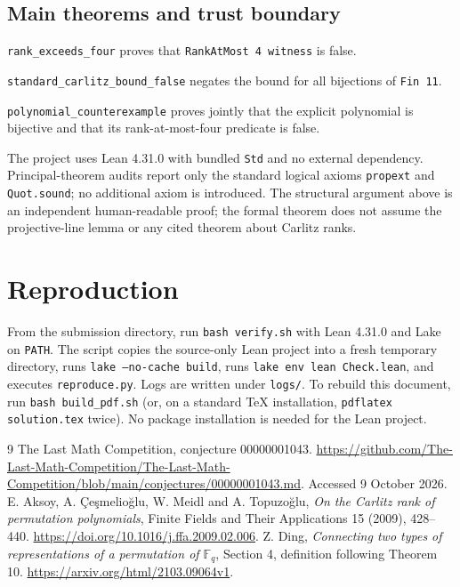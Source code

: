 \documentclass[11pt]{article}
\newcommand{\F}{\mathbb F}
\begin{document}
\subsection{Main theorems and trust boundary}
\noindent\texttt{rank\_exceeds\_four} proves that \texttt{RankAtMost 4 witness} is false.

\noindent\texttt{standard\_carlitz\_bound\_false} negates the bound for all bijections of \texttt{Fin 11}.

\noindent\texttt{polynomial\_counterexample} proves jointly that the explicit polynomial is bijective and that its rank-at-most-four predicate is false.

The project uses Lean 4.31.0 with bundled \texttt{Std} and no external dependency. Principal-theorem audits report only the standard logical axioms \texttt{propext} and \texttt{Quot.sound}; no additional axiom is introduced. The structural argument above is an independent human-readable proof; the formal theorem does not assume the projective-line lemma or any cited theorem about Carlitz ranks.

\section{Reproduction}
From the submission directory, run \texttt{bash verify.sh} with Lean 4.31.0 and Lake on \texttt{PATH}. The script copies the source-only Lean project into a fresh temporary directory, runs \texttt{lake --no-cache build}, runs \texttt{lake env lean Check.lean}, and executes \texttt{reproduce.py}. Logs are written under \texttt{logs/}. To rebuild this document, run \texttt{bash build\_pdf.sh} (or, on a standard TeX installation, \texttt{pdflatex solution.tex} twice). No package installation is needed for the Lean project.

\begin{thebibliography}{9}
The Last Math Competition, conjecture 00000001043.
\url{https://github.com/The-Last-Math-Competition/The-Last-Math-Competition/blob/main/conjectures/00000001043.md}.
Accessed 9 October 2026.
E. Aksoy, A. \c{C}e\c{s}melio\u{g}lu, W. Meidl and A. Topuzo\u{g}lu,
\emph{On the Carlitz rank of permutation polynomials},
Finite Fields and Their Applications 15 (2009), 428--440.
\url{https://doi.org/10.1016/j.ffa.2009.02.006}.
Z. Ding, \emph{Connecting two types of representations of a permutation of $\F_q$}, Section 4, definition following Theorem 10.
\url{https://arxiv.org/html/2103.09064v1}.
\end{thebibliography}
\end{document}
